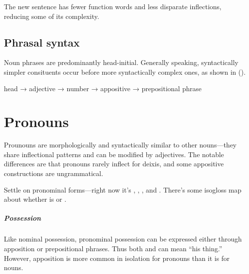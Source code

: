 The new sentence has fewer function words and less disparate inflections, reducing some of its complexity.

\section{Phrasal syntax}
Noun phrases are predominantly head-initial. Generally speaking, syntactically simpler consituents occur before more syntactically complex ones, as shown in (\nextx).

\begin{example}
    head → adjective → number → appositive → prepositional phrase
\end{example}

\setchapterpreamble[u]{\margintoc}
\chapter{Pronouns}
Prounouns are morphologically and syntactically similar to other nouns---they share inflectional patterns and can be modified by adjectives. The notable differences are that pronouns rarely inflect for deixis, and some appositive constructions are ungrammatical.

\begin{kaobox}[frametitle=\sc todo:]
Settle on pronominal forms---right now it's  ,  ,  , and  . There's some isogloss map about whether  is  or .
\end{kaobox}

\paragraph{Possession}
Like nominal possession, pronominal possession can be expressed either through apposition or prepositional phrases.  Thus both  and  can mean “his thing.” However, apposition is more common in isolation for pronouns than it is for nouns.